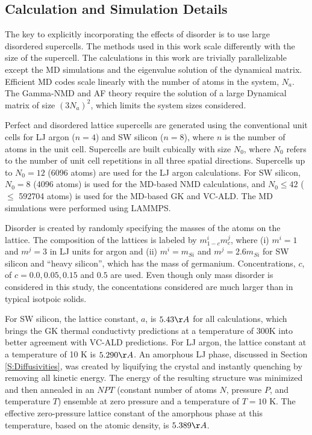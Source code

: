 \documentclass[aps,prb,onecolumn,preprint,superscriptaddress,amsmath,amssymb,floatfix]{revtex4}
\begin{document}
\clearpage

\subsection{\label{S:Calculation}Calculation and Simulation Details}

The key to explicitly incorporating the effects of disorder 
is to use large disordered supercells. The methods used 
in this work scale differently with the size of the supercell. 
The calculations in this work are trivially parallelizable except the 
MD simulations\cite{plimpton_fast_1995} and the eigenvalue solution of the 
dynamical matrix.\cite{gale_general_2003} Efficient MD 
codes scale linearly with the number of atoms in the system, $N_a$.  
The Gamma-NMD and AF theory 
require the solution of a large Dynamical matrix of size 
$(3N_a)^2$, which limits the system sizes considered. 

Perfect and disordered lattice supercells are generated using the 
conventional unit cells for LJ argon ($n=4$) and 
SW silicon ($n=8$), where $n$ is the number of atoms 
in the unit cell. 
Supercells are built cubically with size $N_0$, where $N_0$ refers to the 
number of unit cell repetitions in all three  
spatial directions. Supercells up to $N_0 = 12$ 
(6096 atoms) are used for the LJ argon calculations. For SW silicon, 
$N_0 = 8$ (4096 atoms) is used for 
the MD-based NMD calculations, and $N_0 \le 42$ ($\le$ 592704 atoms) 
is used for the MD-based GK and VC-ALD. 
The MD simulations were performed using LAMMPS.\cite{plimpton_fast_1995} 

Disorder is created by randomly specifying the masses of the atoms 
on the lattice. 
The composition of the lattices is labeled by $m^i_{1-c}m^j_{c}$,  
where (i) $m^i=1$ and $m^j=3$ in 
LJ units for argon and (ii) $m^i=m_{Si}$ and $m^j=2.6m_{Si}$ 
for SW silicon and ``heavy silicon'', which has the mass of germanium. 
Concentrations, $c$, of $c=0.0,0.05,0.15$ and $0.5$ are used. 
Even though only mass disorder is considered in this study, the 
concentations considered are much larger than in typical isotpoic 
solids.\cite{tamura_isotope_1983,lindsay_thermal_2012} 

For SW silicon, the lattice constant, $a$, is $5.43 \AA$ 
for all calculations, which brings the GK thermal conductivty 
predictions at a temperature of 300K
\cite{goicochea_thermal_2010,he_lattice_2012} 
into better agreement with VC-ALD predictions.
\cite{sellan_cross-plane_2010} For LJ argon, the lattice constant 
at a temperature of 10 K is $5.290 \AA$.\cite{mcgaughey_phonon_2004} 
An amorphous LJ phase, discussed in Section \ref{S:Diffusivities}, 
was created by liquifying the crystal 
and instantly quenching by removing all kinetic energy.  The energy 
of the resulting structure was minimized and then annealed in an 
$NPT$ (constant number of atoms $N$, pressure $P$, and temperature $T$) 
ensemble at zero pressure and a temperature of $T=10$ K.  
The effective zero-pressure lattice constant  
of the amorphous phase at this temperature, based on the atomic 
density, is $5.389 \AA$.\cite{mcgaughey_phonon_2004}  
\end{document}
